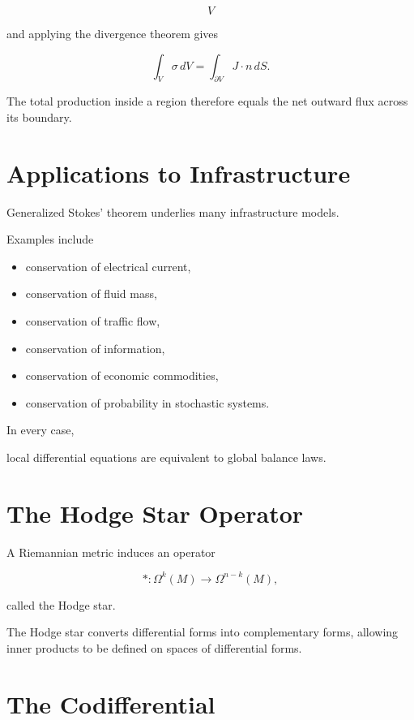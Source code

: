\documentclass[11pt,fleqn]{book}
\numberwithin{equation}{chapter}
\theoremstyle{plain}
\theoremstyle{definition}
\theoremstyle{remark}
\begin{document}
\[
V
\]

and applying the divergence theorem gives

\[
\boxed{
\int_V\sigma\,dV
=
\int_{\partial V}
J\cdot n\,dS.
}
\]

The total production inside a region therefore equals the net outward
flux across its boundary.


\section{Applications to Infrastructure}

Generalized Stokes' theorem underlies many infrastructure models.

Examples include

\begin{itemize}
\item conservation of electrical current,
\item conservation of fluid mass,
\item conservation of traffic flow,
\item conservation of information,
\item conservation of economic commodities,
\item conservation of probability in stochastic systems.
\end{itemize}

In every case,

local differential equations are equivalent to global balance laws.


\section{The Hodge Star Operator}

A Riemannian metric induces an operator

\[
*
:
\Omega^k(M)
\rightarrow
\Omega^{n-k}(M),
\]

called the Hodge star.

The Hodge star converts differential forms into complementary forms,
allowing inner products to be defined on spaces of differential forms.


\section{The Codifferential}
\end{document}
